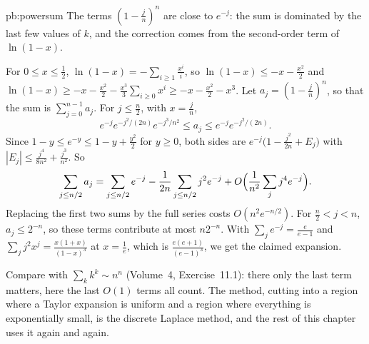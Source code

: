 \begin{solution}{pb:powersum}
\idea The terms $(1-\frac jn)^n$ are close to $e^{-j}$: the sum is dominated by the last few values of $k$, and the correction comes from the second-order term
of $\ln(1-x)$.

\writeup For $0\le x\le\frac12$, $\ln(1-x)=-\sum_{i\ge1}\frac{x^i}i$, so $\ln(1-x)\le-x-\frac{x^2}2$ and $\ln(1-x)\ge-x-\frac{x^2}2-\frac{x^3}3\sum_{i\ge0}x^i\ge-x-\frac{x^2}2-x^3$. Let
$a_j=(1-\frac jn)^n$, so that the sum is $\sum_{j=0}^{n-1}a_j$. For $j\le\frac n2$, with $x=\frac jn$,
\[
e^{-j}e^{-j^2/(2n)}e^{-j^3/n^2}\le a_j\le e^{-j}e^{-j^2/(2n)}.
\]
Since $1-y\le e^{-y}\le1-y+\frac{y^2}2$ for $y\ge0$, both sides are $e^{-j}\bigl(1-\frac{j^2}{2n}+E_j\bigr)$ with $|E_j|\le\frac{j^4}{8n^2}+\frac{j^3}{n^2}$. So
\[
\sum_{j\le n/2}a_j=\sum_{j\le n/2}e^{-j}-\frac1{2n}\sum_{j\le n/2}j^2e^{-j}+O\Bigl(\frac1{n^2}\sum_jj^4e^{-j}\Bigr).
\]
Replacing the first two sums by the full series costs $O(n^2e^{-n/2})$. For $\frac n2<j<n$, $a_j\le2^{-n}$, so these terms contribute at most $n2^{-n}$. With
$\sum_je^{-j}=\frac e{e-1}$ and $\sum_jj^2x^j=\frac{x(1+x)}{(1-x)^3}$ at $x=\frac1e$, which is $\frac{e(e+1)}{(e-1)^3}$, we get the claimed expansion.

\leads Compare with $\sum_kk^k\sim n^n$ (Volume~4, Exercise~11.1): there only the last term matters, here the last $O(1)$ terms all count. The method,
cutting into a region where a Taylor expansion is uniform and a region where everything is exponentially small, is the discrete
Laplace method, and the rest of this chapter uses it again and again.
\end{solution}

